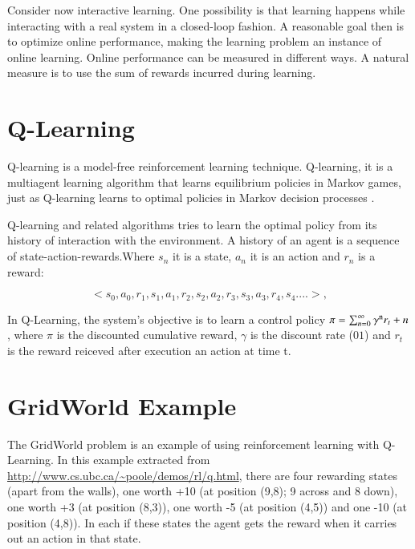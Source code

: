 Consider now interactive learning. One possibility is that learning happens while interacting
with a real system in a closed-loop fashion. A reasonable goal then is to optimize online performance,
making the learning problem an instance of online learning. Online performance
can be measured in different ways. A natural measure is to use the sum of rewards incurred
during learning. 




\section{Q-Learning}

Q-learning is a model-free reinforcement learning technique. Q-learning, it is a multiagent learning algorithm that learns equilibrium policies in Markov games, just as Q-learning learns to optimal policies in Markov decision processes \cite{Greenwald2003}. 

Q-learning and related algorithms tries to learn the optimal policy from its history of interaction with the environment. A history of an agent is a sequence of state-action-rewards.Where $s_{n}$ it is a state, $a_{n}$ it is an action and $r_{n}$ is a reward:

\begin{equation}
<s_{0},a_{0},r_{1},s_{1},a_{1},r_{2},s_{2},a_{2},r_{3},s_{3},a_{3},r_{4},s_{4}....>,
\end{equation}


In Q-Learning, the system's objective is to learn a control policy $\pi = \sum_{n=0}^{\infty} \gamma\textsuperscript{n}  r_{t}+n $, where $\pi$  is the discounted cumulative reward, $\gamma$ is the discount rate ($01$) and $r_{t}$ is the reward reiceved after execution an action at time t.

\section{GridWorld Example}

The GridWorld problem is an example of using reinforcement learning with Q-Learning. In this example extracted from \url{http://www.cs.ubc.ca/~poole/demos/rl/q.html}, there are four rewarding states (apart from the walls), one worth +10 (at position (9,8); 9 across and 8 down), one worth +3 (at position (8,3)), one worth -5 (at position (4,5)) and one -10 (at position (4,8)). In each if these states the agent gets the reward when it carries out an action in that state.


